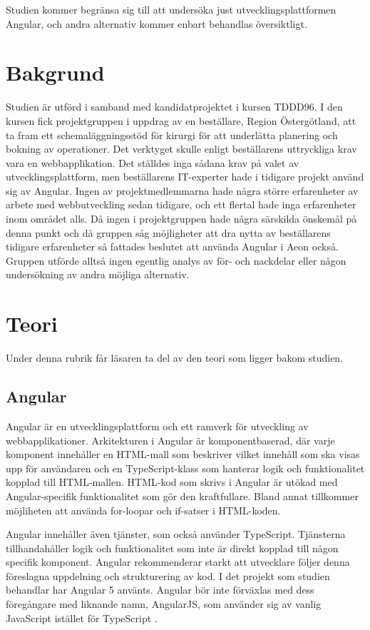Studien kommer begränsa sig till att undersöka just utvecklingsplattformen Angular, och andra alternativ kommer enbart behandlas översiktligt.

\section{Bakgrund}


Studien är utförd i samband med kandidatprojektet i kursen TDDD96. I den kursen fick projektgruppen i uppdrag av en beställare, Region Östergötland, att ta fram ett schemaläggningsstöd för kirurgi för att underlätta planering och bokning av operationer. Det verktyget skulle enligt beställarens uttryckliga krav vara en webbapplikation. Det ställdes inga sådana krav på valet av utvecklingsplattform, men beställarens IT-experter hade i tidigare projekt använd sig av Angular. Ingen av projektmedlemmarna hade några större erfarenheter av arbete med webbutveckling sedan tidigare, och ett flertal hade inga erfarenheter inom området alls. Då ingen i projektgruppen hade några särskilda önskemål på denna punkt och då gruppen såg möjligheter att dra nytta av beställarens tidigare erfarenheter så fattades beslutet att använda Angular i Aeon också. Gruppen utförde alltså ingen egentlig analys av för- och nackdelar eller någon undersökning av andra möjliga alternativ.  

\section{Teori}

Under denna rubrik får läsaren ta del av den teori som ligger bakom studien.

\subsection{Angular}

Angular är en utvecklingsplattform och ett ramverk för utveckling av webbapplikationer. Arkitekturen i Angular är komponentbaserad, där varje komponent innehåller en HTML-mall som beskriver vilket innehåll som ska visas upp för användaren och en TypeScript-klass som hanterar logik och funktionalitet kopplad till HTML-mallen. HTML-kod som skrivs i Angular är utökad med Angular-specifik funktionalitet som gör den kraftfullare. Bland annat tillkommer möjliheten att använda for-loopar och if-satser i HTML-koden.

Angular innehåller även tjänster, som också använder TypeScript. Tjänsterna tillhandahåller logik och funktionalitet som inte är direkt kopplad till någon specifik komponent. Angular rekommenderar starkt att utvecklare följer denna föreslagna uppdelning och strukturering av kod. I det projekt som studien behandlar har Angular 5 använts. Angular bör inte förväxlas med dess föregångare med liknande namn, AngularJS, som använder sig av vanlig JavaScript istället för TypeScript \cite{angularguide}.


